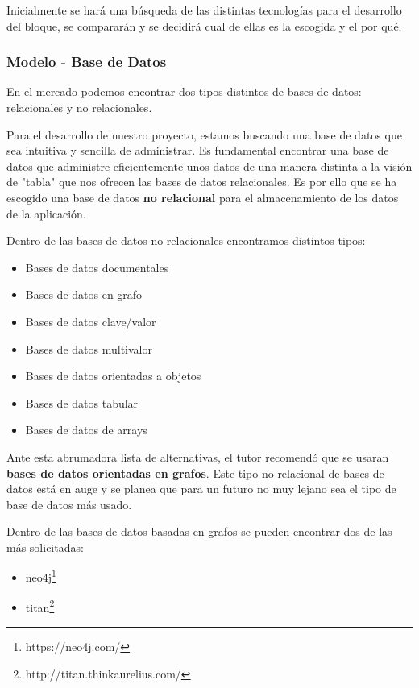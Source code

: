Inicialmente se hará una búsqueda de las distintas tecnologías para el desarrollo del bloque, se compararán y se decidirá cual de ellas es la escogida y el por qué.

\subsubsection{Modelo - Base de Datos}

En el mercado podemos encontrar dos tipos distintos de bases de datos: relacionales y no relacionales\cite{tipobd}. 

Para el desarrollo de nuestro proyecto, estamos buscando una base de datos que sea intuitiva y sencilla de administrar. Es fundamental encontrar una base de datos que administre eficientemente unos datos de una manera distinta a la visión de "tabla" que nos ofrecen las bases de datos relacionales. Es por ello que se ha escogido una base de datos \textbf{no relacional} para el almacenamiento de los datos de la aplicación.

Dentro de las bases de datos no relacionales encontramos distintos tipos:

\begin{itemize}
    \item Bases de datos documentales
    \item Bases de datos en grafo
    \item Bases de datos clave/valor
    \item Bases de datos multivalor
    \item Bases de datos orientadas a objetos
    \item Bases de datos tabular
    \item Bases de datos de arrays
\end{itemize}

Ante esta abrumadora lista de alternativas, el tutor recomendó que se usaran\textbf{ bases de datos orientadas en grafos}. Este tipo no relacional de bases de datos está en auge y se planea que para un futuro no muy lejano sea el tipo de base de datos más usado\cite{bdnorel1}\cite{bdnorel2}. 

Dentro de las bases de datos basadas en grafos se pueden encontrar dos de las más solicitadas:

\begin{itemize}
    \item neo4j\footnote{https://neo4j.com/}
    \item titan\footnote{http://titan.thinkaurelius.com/}
\end{itemize}


